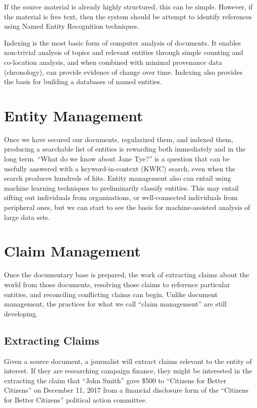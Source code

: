 \documentclass[format=siggraph, review=true]{acmart}
\begin{document}
If the source material is already highly structured, this can be
simple. However, if the material is free text, then the system should
be attempt to identify references using Named Entity Recognition
techniques. 

Indexing is the most basic form of computer analysis of documents. It
enables non-trivial analysis of topics and relevant entities through
simple counting and co-location analysis, and when combined with
minimal provenance data (chronology), can provide evidence of change
over time. Indexing also provides the basis for building a databases
of named entities.

\section{Entity Management}

Once we have secured our documents, regularized them, and indexed
them, producing a searchable list of entities is rewarding both
immediately and in the long term. ``What do we know about Jane Tye?''
is a question that can be usefully answered with a keyword-in-context
(KWIC) search, even when the search produces hundreds of hits. Entity
management also can entail using machine learning techniques to
preliminarily classify entities. This may entail sifting out
individuals from organizations, or well-connected individuals from
peripheral ones, but we can start to see the basis for
machine-assisted analysis of large data sets.

\section{Claim Management}
Once the documentary base is prepared, the work of extracting claims
about the world from those documents, resolving those claims to
reference particular entities, and reconciling conflicting claims can
begin. Unlike document management, the practices for what we call
``claim management'' are still developing.

\subsection{Extracting Claims}
Given a source document, a journalist will extract claims relevant to
the entity of interest. If they are researching campaign finance, they
might be interested in the extracting the claim that ``John Smith''
gave \$500 to ``Citizens for Better Citizens'' on December 11, 2017
from a financial disclosure form of the ``Citizens for Better
Citizens'' political action committee.
\end{document}
